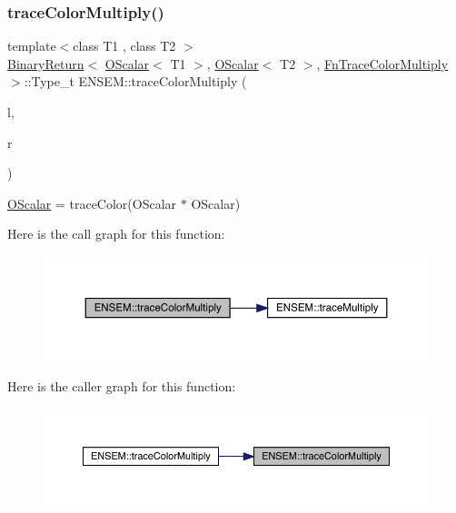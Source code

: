 \subsubsection{\texorpdfstring{traceColorMultiply()}{traceColorMultiply()}}
{\footnotesize\ttfamily template$<$class T1 , class T2 $>$ \\
\mbox{\hyperlink{structENSEM_1_1BinaryReturn}{Binary\+Return}}$<$ \mbox{\hyperlink{classENSEM_1_1OScalar}{O\+Scalar}}$<$ T1 $>$, \mbox{\hyperlink{classENSEM_1_1OScalar}{O\+Scalar}}$<$ T2 $>$, \mbox{\hyperlink{structENSEM_1_1FnTraceColorMultiply}{Fn\+Trace\+Color\+Multiply}} $>$\+::Type\+\_\+t E\+N\+S\+E\+M\+::trace\+Color\+Multiply (\begin{DoxyParamCaption}\item[{const \mbox{\hyperlink{classENSEM_1_1OScalar}{O\+Scalar}}$<$ T1 $>$ \&}]{l,  }\item[{const \mbox{\hyperlink{classENSEM_1_1OScalar}{O\+Scalar}}$<$ T2 $>$ \&}]{r }\end{DoxyParamCaption})\hspace{0.3cm}{\ttfamily [inline]}}



\mbox{\hyperlink{classENSEM_1_1OScalar}{O\+Scalar}} = trace\+Color(\+O\+Scalar $\ast$ O\+Scalar) 

Here is the call graph for this function\+:\nopagebreak
\begin{figure}[H]
\begin{center}
\leavevmode
\includegraphics[width=350pt]{d1/d71/group__obsscalar_gabe14ff90818892f233905fa6dad8eb49_cgraph}
\end{center}
\end{figure}
Here is the caller graph for this function\+:\nopagebreak
\begin{figure}[H]
\begin{center}
\leavevmode
\includegraphics[width=350pt]{d1/d71/group__obsscalar_gabe14ff90818892f233905fa6dad8eb49_icgraph}
\end{center}
\end{figure}
\mbox{\label{group__obsscalar_ga5b8fcde5132f05c1632c08d0e22c04a7}} 
